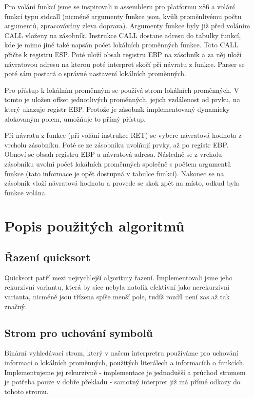 \documentclass[a4paper,11pt,titlepage]{article}
\begin{document}
Pro volání funkcí jsme se inspirovali u assembleru pro platformu x86 a volání funkcí typu stdcall (nicméně argumenty funkce jsou, kvůli proměnlivému počtu argumentů, zpracovávány zleva doprava). Argumenty funkce byly již před voláním CALL vloženy na zásobník. Instrukce CALL dostane adresu do tabulky funkcí, kde je mimo jiné také napsán počet lokálních pro\-měn\-ných funkce. Toto CALL přičte k registru ESP. Poté uloží obsah registru EBP na zásobník a za něj uloží návratovou adresu na kterou poté interpret skočí při návratu z funkce. Parser se poté sám postará o správné nastavení lokálních proměnných.


Pro přístup k lokálním proměnným se používá strom lokálních pro\-měn\-ných. V tomto je uložen offset jednotlivých proměnných, jejich vzdálenost od prvku, na který ukazuje registr EBP. Protože je zásobník implementovaný dynamicky alokovaným polem, umožňuje to přímý přístup.


Při návratu z funkce (při volání instrukce RET) se vybere návratová hodnota z vrcholu zásobníku. Poté se ze zásobníku uvolňují prvky, až po registr EBP. Obnoví se obsah registru EBP a návratová adresa. Následně se z vrcholu zásobníku uvolní počet lokálních proměnných společně s počtem argumentů funkce (tato informace je opět dostupná v tabulce funkcí). Nakonec se na zásobník vloží návratová hodnota a provede se skok zpět na místo, odkud byla funkce volána.

\section{Popis použitých algoritmů}

\subsection{Řazení quicksort}

Quicksort patří mezi nejrychlejší algoritmy řazení. Implementovali jsme jeho rekurzivní variantu, která by sice nebyla natolik efektivní jako nerekurzivní varianta, nicméně jsou třízena spíše menší pole, tudíž rozdíl není zas až tak značný.

\subsection{Strom pro uchování symbolů}

Binární vyhledávací strom, který v našem interpretru používáme pro u\-cho\-vá\-ní informací o lokálních proměnných, použitých literálech a informacích o funk\-cích. Implementujeme jej rekurzivně - implementace je jednodušší a průchod stromem je potřeba pouze v dobře překladu - samotný interpret již má přímé odkazy do tohoto stromu.
\end{document}
